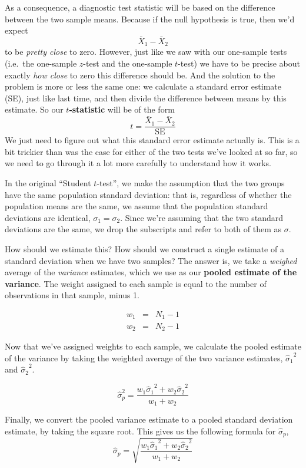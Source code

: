 \documentclass[
  11pt,
  a4paper,
  twoside,symmetric,openright]{book}
\theoremstyle{break}
\theoremstyle{break}
\begin{document}
As a consequence, a diagnostic test statistic will be based on the difference between the two sample means. Because if the null hypothesis is true, then we'd expect
\[
\bar{X}_1 - \bar{X}_2
\]
to be \emph{pretty close} to zero. However, just like we saw with our one-sample tests (i.e.~the one-sample \(z\)-test and the one-sample \(t\)-test) we have to be precise about exactly \emph{how close} to zero this difference should be. And the solution to the problem is more or less the same one: we calculate a standard error estimate (SE), just like last time, and then divide the difference between means by this estimate. So our \textbf{\(t\)-statistic} will be of the form
\[
t = \frac{\bar{X}_1 - \bar{X}_2}{\mbox{SE}}
\]
We just need to figure out what this standard error estimate actually is. This is a bit trickier than was the case for either of the two tests we've looked at so far, so we need to go through it a lot more carefully to understand how it works.

In the original ``Student \(t\)-test'', we make the assumption that the two groups have the same population standard deviation: that is, regardless of whether the population means are the same, we assume that the population standard deviations are identical, \(\sigma_1 = \sigma_2\). Since we're assuming that the two standard deviations are the same, we drop the subscripts and refer to both of them as \(\sigma\).

How should we estimate this? How should we construct a single estimate of a standard deviation when we have two samples? The answer is, we take a \emph{weighed} average of the \emph{variance} estimates, which we use as our \textbf{pooled estimate of the variance}. The weight assigned to each sample is equal to the number of observations in that sample, minus 1.

\[
\begin{array}{rcl}
w_1 &=& N_1 - 1\\
w_2 &=& N_2 - 1
\end{array}
\]

Now that we've assigned weights to each sample, we calculate the pooled estimate of the variance by taking the weighted average of the two variance estimates, \({\hat\sigma_1}^2\) and \({\hat\sigma_2}^2\).

\[
\hat\sigma^2_p = \frac{w_1 {\hat\sigma_1}^2 + w_2 {\hat\sigma_2}^2}{w_1 + w_2}
\]

Finally, we convert the pooled variance estimate to a pooled standard deviation estimate, by taking the square root. This gives us the following formula for \(\hat\sigma_p\),
\[
\hat\sigma_p = \sqrt{\frac{w_1 {\hat\sigma_1}^2 + w_2 {\hat\sigma_2}^2}{w_1 + w_2}}
\]
\end{document}
